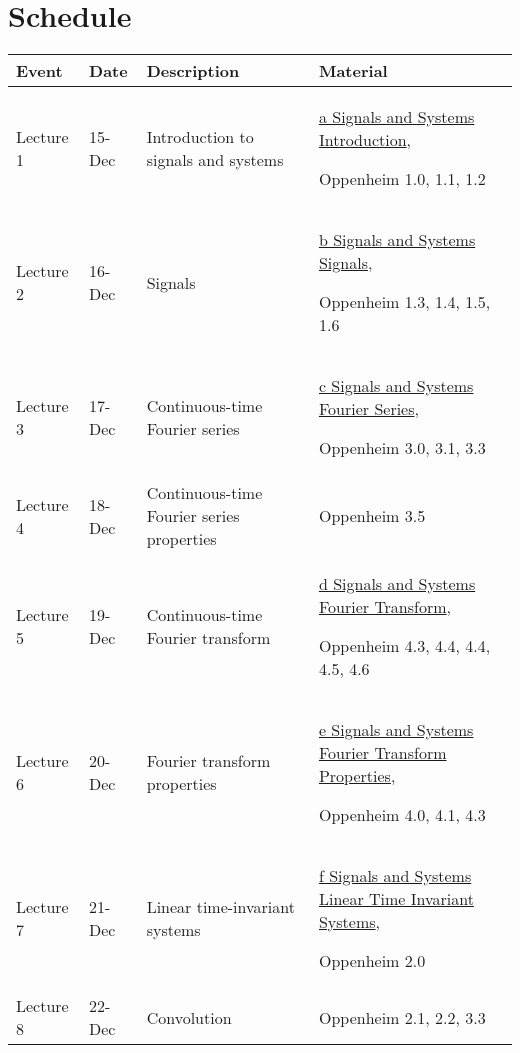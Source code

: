 \documentclass[11pt, a4paper]{article}
\begin{document}
\section{Schedule}

 
\begin{tabular}{@{}llp{2in}p{3in}@{}}
\toprule
Event 	&	Date 	&	Description	&						Material	\\
\midrule
Lecture 1	&	15-Dec	&	Introduction to signals and systems	&	\href{https://github.com/rangarodrigo/EN1060Lectures/blob/master/a\%20Signals\%20and\%20Systems\%20Introduction.pdf}{	a Signals and Systems Introduction}, \par	Oppenheim 1.0, 1.1, 1.2	\\
Lecture 2	&	16-Dec	&	Signals	&	\href{https://github.com/rangarodrigo/EN1060Lectures/blob/master/b\%20Signals\%20and\%20Systems\%20Signals.pdf}{	b Signals and Systems Signals}, \par	Oppenheim 1.3, 1.4, 1.5, 1.6	\\
Lecture 3	&	17-Dec	&	Continuous-time Fourier series	&	\href{https://github.com/rangarodrigo/EN1060Lectures/blob/master/c\%20Signals\%20and\%20Systems\%20Fourier\%20Series.pdf	}{c Signals and Systems Fourier Series}, \par	Oppenheim 3.0, 3.1, 3.3	\\
Lecture 4	&	18-Dec	&	Continuous-time Fourier series properties	&Oppenheim 3.5	\\
Lecture 5	&	19-Dec	&	Continuous-time Fourier transform	&	\href{https://github.com/rangarodrigo/EN1060Lectures/blob/master/d\%20Signals\%20and\%20Systems\%20Fourier\%20Transform.pdf	}{d Signals and Systems Fourier Transform}, \par	Oppenheim 4.3, 4.4, 4.4, 4.5, 4.6	\\
Lecture 6	&	20-Dec	&	Fourier transform properties	&	\href{https://github.com/rangarodrigo/EN1060Lectures/blob/master/e\%20Signals\%20and\%20Systems\%20Fourier\%20Transform\%20Properties.pdf	}{e Signals and Systems Fourier Transform Properties}, \par	Oppenheim 4.0, 4.1, 4.3	\\
Lecture 7	&	21-Dec	&	Linear time-invariant systems	&	\href{https://github.com/rangarodrigo/EN1060Lectures/blob/master/f\%20Signals\%20and\%20Systems\%20Linear\%20Time\%20Invariant\%20Systems.pdf	}{f Signals and Systems Linear Time Invariant Systems}, \par	Oppenheim 2.0	\\
Lecture 8	&	22-Dec	&	Convolution	&	 \par	Oppenheim 2.1, 2.2, 3.3	\\

\end{tabular}
\end{document}
